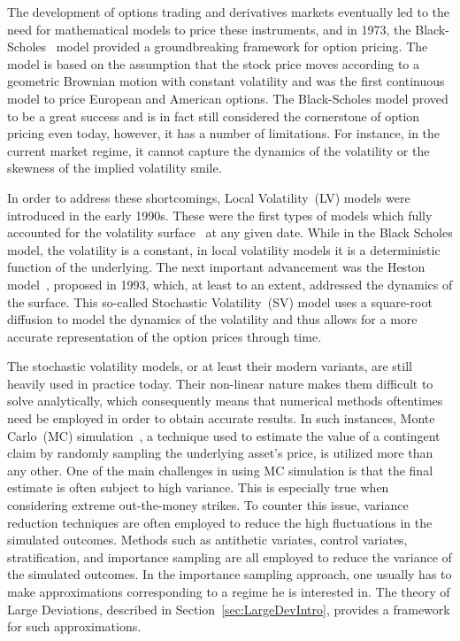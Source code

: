 The development of options trading and derivatives markets eventually led to the need for mathematical models to price these instruments, and in 1973, the Black-Scholes~\cite{Black1973TheLiabilities} model provided a groundbreaking framework for option pricing.
The model is based on the assumption that the stock price moves according to a geometric Brownian motion with constant volatility and was the first continuous model to price European and American options. The Black-Scholes model proved to be a great success and is in fact still considered the cornerstone of option pricing even today, however, it has a number of limitations. For instance, in the current market regime, it cannot capture the dynamics of the volatility or the skewness of the implied volatility smile.

In order to address these shortcomings, Local Volatility~(LV) models were introduced in the early 1990s. These were the first types of models which fully accounted for the volatility surface~\cite{Dupire1994PricingSmile, Derman1994RidingSmile} at any given date. While in the Black Scholes model, the volatility is a constant, in local volatility models it is a deterministic function of the underlying. The next important advancement was the Heston model~\cite{Heston1993AOptions}, proposed in 1993, which, at least to an extent, addressed the dynamics of the surface. This so-called Stochastic Volatility~(SV) model uses a square-root diffusion to model the dynamics of the volatility and thus allows for a more accurate representation of the option prices through time.

The stochastic volatility models, or at least their modern variants, are still heavily used in practice today. Their non-linear nature makes them difficult to solve analytically, which consequently means that numerical methods oftentimes need be employed in order to obtain accurate results. In such instances, Monte Carlo~(MC) simulation~\cite{Glasserman2013MonteEngineering}, a technique used to estimate the value of a contingent claim by randomly sampling the underlying asset's price, is utilized more than any other. One of the main challenges in using MC simulation is that the final estimate is often subject to high variance. This is especially true when considering extreme out-the-money strikes. To counter this issue, variance reduction techniques are often employed to reduce the high fluctuations in the simulated outcomes. Methods such as antithetic variates, control variates, stratification, and importance sampling are all employed to reduce the variance of the simulated outcomes. In the importance sampling approach, one usually has to make approximations corresponding to a regime he is interested in. The theory of Large Deviations, described in Section~\ref{sec:LargeDevIntro}, provides a framework for such approximations.

